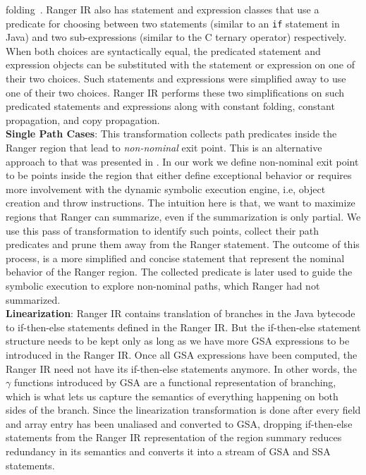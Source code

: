 folding~\cite{dragon-book}.
%
Ranger IR also has statement and expression classes that use a predicate for choosing between two statements (similar to
an {\tt if} statement in Java) and two sub-expressions (similar to the C ternary operator) respectively.
%
When both choices are syntactically equal, the predicated statement and expression objects can be substituted with the
statement or expression on one of their two choices.
%
Such statements and expressions were simplified away to use one of their two choices.
%
Ranger IR performs these two simplifications on such predicated statements and expressions along with constant folding,
constant propagation, and copy propagation.\\
\textbf{Single Path Cases}: This transformation collects path predicates inside the Ranger region that lead to \textit{non-nominal} exit point.
%
This is an alternative approach to that was presented in \cite{veritesting}.
%
In our work we define non-nominal exit point to be points inside the region that either define exceptional behavior or requires more involvement with the dynamic symbolic execution engine, i.e, object creation and throw instructions.
%
The intuition here is that, we want to maximize regions that Ranger can summarize, even if the summarization is only partial.
%
We use this pass of transformation to identify such points, collect their path predicates and prune them away from the Ranger statement.
%
The outcome of this process, is a more simplified and concise statement that represent the nominal behavior of the Ranger region.
%
The collected predicate is later used to guide the symbolic execution to explore non-nominal paths, which Ranger had not summarized.  \\
%
\textbf{Linearization}:
Ranger IR contains translation of branches in the Java bytecode to if-then-else statements defined in the Ranger IR.
%
But the if-then-else statement structure needs to be kept only as long as we have more GSA expressions to be
introduced in the Ranger IR.
%
Once all GSA expressions have been computed, the Ranger IR need not have its if-then-else statements anymore.
%
In other words, the $\gamma$ functions introduced by GSA are a functional representation of branching, which is what lets us
capture the semantics of everything happening on both sides of the branch.
%
Since the linearization transformation is done after every field and array entry has been unaliased and converted to
GSA, dropping if-then-else statements from the Ranger IR representation of the region summary reduces redundancy in its
semantics and converts it into a stream of GSA and SSA statements.\\

